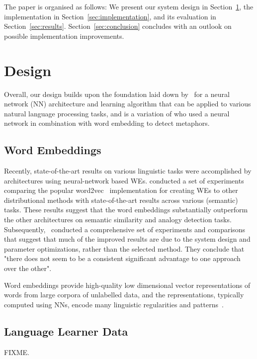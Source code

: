 \documentclass[11pt,a4paper]{article}
\begin{document}
The paper is organised as follows: We present our system design in
Section~\ref{sec:design}, the implementation in
Section~\ref{sec:implementation}, and its evaluation in
Section~\ref{sec:results}. 
Section~\ref{sec:conclusion} concludes with an outlook on possible
implementation improvements.

\section{Design} %
\label{sec:design}

Overall, our design builds upon the foundation
laid down by~ for a neural network (NN) architecture
and learning algorithm that can be applied to various natural language
processing tasks, and is a variation of \cite{W16-1104} who used a neural network in combination with word embedding to detect metaphors.

\subsection{Word Embeddings} %

Recently, state-of-the-art results on various linguistic tasks were
accomplished by architectures using neural-network based WEs.
 conducted a set of
experiments comparing the popular
word2vec~\cite{DBLP:journals/corr/abs-1301-3781,arXiv:1310.4546}
implementation for creating WEs to other distributional methods with
state-of-the-art results across various (semantic) tasks. 
These results suggest that the word embeddings substantially
outperform the other architectures on semantic similarity and analogy
detection tasks.
Subsequently,~ conducted a comprehensive set of
experiments and comparisons that suggest that much of the improved results are
due to the system design and parameter optimizations, rather than the selected
method.  
They conclude that "there does not seem to be a consistent significant
advantage to one approach over the other".

Word embeddings provide high-quality low dimensional vector representations of
words from large corpora of unlabelled data, and the representations, typically
computed using NNs, encode many linguistic regularities and
patterns~\cite{arXiv:1310.4546}.


\subsection{Language Learner Data}
FIXME.
\end{document}
